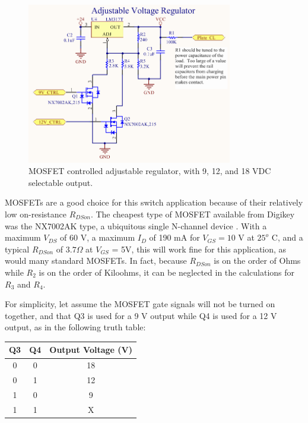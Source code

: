 \documentclass{article}
\begin{document}
		\begin{figure}
			\centering
			\includegraphics[width = 0.8\textwidth]{PR2Images/AdjustableRegulatorSchematic}
			\caption{MOSFET controlled adjustable regulator, with 9, 12, and 18 VDC selectable output.}
			\label{fig:adjustableregulatorschematic}
		\end{figure}

		MOSFETs are a good choice for this switch application because of their relatively low on-resistance $R_{DSon}$.  The cheapest type of MOSFET available from Digikey was the NX7002AK type, a ubiquitous single N-channel device \cite{NX7002AKdatasheet}.  With a maximum $V_{DS}$ of 60 V, a maximum $I_D$ of 190 mA for $V_{GS} = 10$ V at $25^o$ C, and a typical $R_{DSon}$ of $3.7 \Omega$ at $V_{GS}$ = 5V, this will work fine for this application, as would many standard MOSFETs.  In fact, because $R_{DSon}$ is on the order of Ohms while $R_2$ is on the order of Kiloohms, it can be neglected in the calculations for $R_3$ and $R_4$.

		For simplicity, let assume the MOSFET gate signals will not be turned on together, and that Q3 is used for a 9 V output while Q4 is used for a 12 V output, as in the following truth table:

		\begin{center}
		\begin{tabular}{c c|c}
			Q3 & Q4 & Output Voltage (V) \\
			\hline
			0 & 0 & 18 \\
			0 & 1 & 12 \\
			1 & 0 & 9 \\
			1 & 1 & X
		\end{tabular}
		\end{center}
\end{document}
